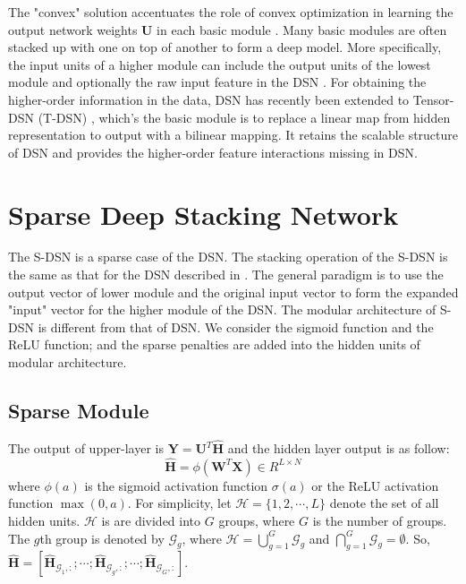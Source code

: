 \documentclass[letterpaper]{article}
\begin{document}
The "convex" solution accentuates the role of convex optimization in learning the output network weights $\textbf{U}$ in each basic module \cite{Deng2011a}. Many basic modules are often stacked up with one on top of another to form a deep model. More specifically, the input units of a higher module can include the output units of the lowest module and optionally the raw input feature in the DSN \cite{Deng2011b}. For obtaining the higher-order information in the data, DSN has recently been extended to Tensor-DSN (T-DSN) \cite{Hutchinson2013}, which's the basic module is to replace a linear map from hidden representation to output with a bilinear mapping. It retains the scalable structure of DSN and provides the higher-order feature interactions missing in DSN.

\section{Sparse Deep Stacking Network}
\label{sec:sdsn}
The S-DSN is a sparse case of the DSN. The stacking operation of the S-DSN is the same as that for the DSN described in \cite{Deng2011b}. The general paradigm is to use the output vector of lower module and the original input vector to form the expanded "input" vector for the higher module of the DSN. The modular architecture of S-DSN is different from that of DSN. We consider the sigmoid function and the ReLU function; and the sparse penalties are added into the hidden units of modular architecture.

\subsection{Sparse Module}
\label{sec:sparsemodule}
The output of upper-layer is $\textbf{Y}=\textbf{U}^T\widehat{\textbf{H}}$ and the hidden layer output is as follow:
\begin{equation}
\widehat{\textbf{H}}=\phi(\textbf{W}^T\textbf{X})\in R^{L\times N}
\label{eq:hiddenrep}
\end{equation}
where $\phi(a)$ is the sigmoid activation function $\sigma(a)$ or the ReLU activation function $\max(0,a)$. For simplicity, let $\mathcal{H}=\{1,2,\cdots,L\}$ denote the set of all hidden units. $\mathcal{H}$ is are divided into $G$ groups, where $G$ is the number of groups. The $g$th group is denoted by $\mathcal{G}_g$, where $\mathcal{H}=\bigcup_{g=1}^G\mathcal{G}_g$ and $\bigcap_{g=1}^G\mathcal{G}_g=\emptyset$. So,
$\widehat{\textbf{H}}=[\widehat{\textbf{H}}_{\mathcal{G}_1,:};\cdots;\widehat{\textbf{H}}_{\mathcal{G}_g,:};\cdots;\widehat{\textbf{H}}_{\mathcal{G}_G,:}]$.
\end{document}
